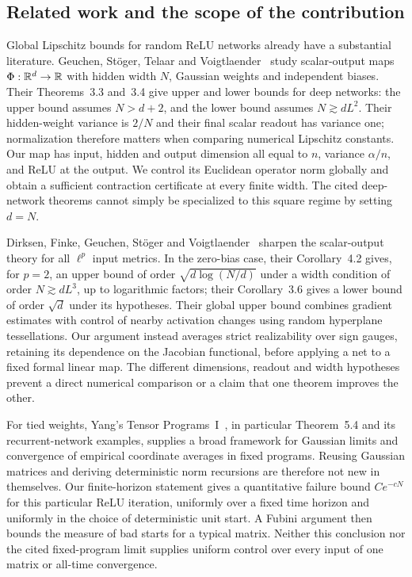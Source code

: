 \subsection{Related work and the scope of the contribution}
\label{sec:related}

Global Lipschitz bounds for random ReLU networks already have a substantial literature. Geuchen, St\"oger, Telaar and Voigtlaender~\cite{geuchen2025} study scalar-output maps $\Phi:\mathbb{R}^d\to\mathbb{R}$ with hidden width $N$, Gaussian weights and independent biases. Their Theorems~3.3 and~3.4 give upper and lower bounds for deep networks: the upper bound assumes $N>d+2$, and the lower bound assumes $N\gtrsim dL^2$. Their hidden-weight variance is $2/N$ and their final scalar readout has variance one; normalization therefore matters when comparing numerical Lipschitz constants. Our map has input, hidden and output dimension all equal to $n$, variance $\alpha/n$, and ReLU at the output. We control its Euclidean operator norm globally and obtain a sufficient contraction certificate at every finite width. The cited deep-network theorems cannot simply be specialized to this square regime by setting $d=N$.

Dirksen, Finke, Geuchen, St\"oger and Voigtlaender~\cite{dirksen2025} sharpen the scalar-output theory for all $\ell^p$ input metrics. In the zero-bias case, their Corollary~4.2 gives, for $p=2$, an upper bound of order $\sqrt{d\log(N/d)}$ under a width condition of order $N\gtrsim dL^3$, up to logarithmic factors; their Corollary~3.6 gives a lower bound of order $\sqrt d$ under its hypotheses. Their global upper bound combines gradient estimates with control of nearby activation changes using random hyperplane tessellations. Our argument instead averages strict realizability over sign gauges, retaining its dependence on the Jacobian functional, before applying a net to a fixed formal linear map. The different dimensions, readout and width hypotheses prevent a direct numerical comparison or a claim that one theorem improves the other.

For tied weights, Yang's Tensor Programs~I~\cite{yang2019}, in particular Theorem~5.4 and its recurrent-network examples, supplies a broad framework for Gaussian limits and convergence of empirical coordinate averages in fixed programs. Reusing Gaussian matrices and deriving deterministic norm recursions are therefore not new in themselves. Our finite-horizon statement gives a quantitative failure bound $Ce^{-cN}$ for this particular ReLU iteration, uniformly over a fixed time horizon and uniformly in the choice of deterministic unit start. A Fubini argument then bounds the measure of bad starts for a typical matrix. Neither this conclusion nor the cited fixed-program limit supplies uniform control over every input of one matrix or all-time convergence.

